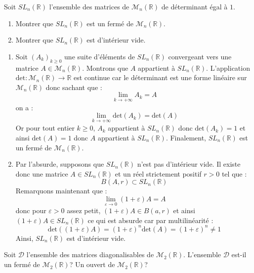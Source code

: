\documentclass[a4paper,10pt]{report}
\begin{document}
\begin{Exercice}{} Soit $SL_n(\mathbb{R})$ l'ensemble des matrices de $\mathcal{M}_n(\mathbb{R})$ de déterminant égal à $1$.
\begin{enumerate}
\item Montrer que $SL_n(\mathbb{R})$ est un fermé de $\mathcal{M}_n(\mathbb{R})$.
\item Montrer que $SL_n(\mathbb{R})$ est d'intérieur vide.
\end{enumerate}
\end{Exercice}

\corr 

\begin{enumerate}
\item Soit $(A_k)_{k \geq 0}$ une suite d'éléments de $SL_n(\mathbb{R})$ convergeant vers une matrice $A \in \mathcal{M}_n(\mathbb{R})$. Montrons que $A$ appartient à $SL_n(\mathbb{R})$. L'application $\textrm{det} : \mathcal{M}_n(\mathbb{R}) \rightarrow \mathbb{R}$ est continue car le déterminant est une forme linéaire sur $\mathcal{M}_n(\mathbb{R})$ donc sachant que  :
$$ \lim_{k \rightarrow + \infty} A_k = A$$
on a :
$$ \lim_{k \rightarrow + \infty} \textrm{det}(A_k) = \textrm{det}(A)$$
Or pour tout entier $k \geq 0$, $A_k$ appartient à $SL_n(\mathbb{R})$ donc $\textrm{det}(A_k)=1$ et ainsi $\textrm{det}(A)=1$ donc $A$ appartient à $SL_n(\mathbb{R})$. Finalement, $SL_n(\mathbb{R})$ est un fermé de $\mathcal{M}_n(\mathbb{R})$.
\item Par l'absurde, supposons que $SL_n(\mathbb{R})$ n'est pas d'intérieur vide. Il existe donc une matrice $A \in SL_n(\mathbb{R})$ et un réel strictement positif $r>0$ tel que :
$$ B(A,r) \subset SL_n(\mathbb{R})$$
Remarquons maintenant que :
$$ \lim_{\varepsilon \rightarrow 0} (1+ \varepsilon) A= A$$
donc pour $\varepsilon>0$ assez petit, $(1+ \varepsilon) A \in B(a,r)$ et ainsi $(1+ \varepsilon) A \in SL_n(\mathbb{R})$ ce qui est absurde car par multilinéarité : 
$$ \textrm{det}((1+ \varepsilon)A)= (1+\varepsilon)^n \textrm{det}(A) = (1+\varepsilon)^n \neq 1$$
Ainsi, $SL_n(\mathbb{R})$ est d'intérieur vide.
\end{enumerate}

\begin{Exercice}{} Soit $\mathcal{D}$ l'ensemble des matrices diagonalisables de $\mathcal{M}_2(\mathbb{R})$. L'ensemble $\mathcal{D}$ est-il un fermé de $\mathcal{M}_2(\mathbb{R})$? Un ouvert de $\mathcal{M}_2(\mathbb{R})$?
\end{Exercice}
\end{document}
